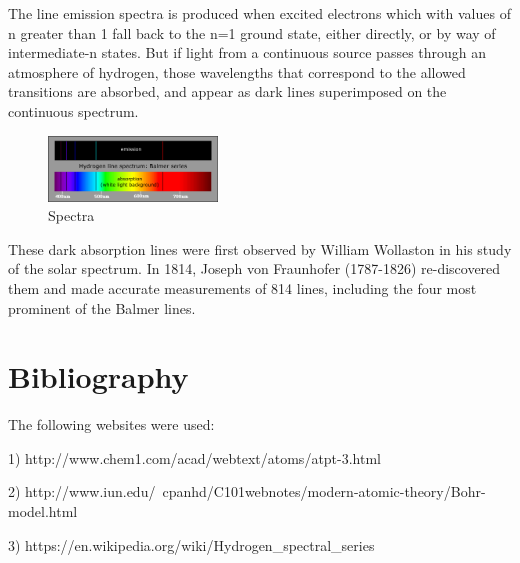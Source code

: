 \documentclass{article}
\begin{document}
The line emission spectra is produced when excited electrons which with values of n greater than 1 fall back to the n=1 ground state, either directly, or by way of intermediate-n states. But if light from a continuous source passes through an atmosphere of hydrogen, those wavelengths that correspond to the allowed transitions are absorbed, and appear as dark lines superimposed on the continuous spectrum.

\begin{figure}[h]
\begin{center}
\includegraphics[width=0.4\textwidth]{balmer} %
\caption{Spectra}
\end{center}
\end{figure}

These dark absorption lines were first observed by William Wollaston in his study of the solar spectrum. In 1814, Joseph von Fraunhofer (1787-1826) re-discovered them and made accurate measurements of 814 lines, including the four most prominent of the Balmer lines.

\section{Bibliography}
The following websites were used:

1)  http://www.chem1.com/acad/webtext/atoms/atpt-3.html

2) http://www.iun.edu/~cpanhd/C101webnotes/modern-atomic-theory/Bohr-model.html

3) https://en.wikipedia.org/wiki/Hydrogen_spectral_series
\end{document}
